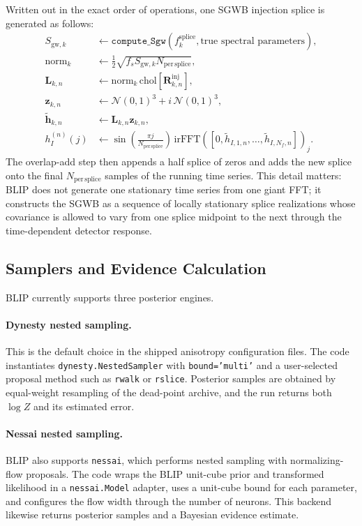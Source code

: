 \documentclass[11pt]{article}
\begin{document}
Written out in the exact order of operations, one SGWB injection splice is generated as follows:
\begin{align}
S_{\mathrm{gw},k} &\leftarrow \texttt{compute\_Sgw}(f_k^{\mathrm{splice}},\text{true spectral parameters}), \\
\mathrm{norm}_k &\leftarrow \frac{1}{2}\sqrt{f_s S_{\mathrm{gw},k} N_{\mathrm{per\,splice}}}, \\
\mathbf{L}_{k,n} &\leftarrow \mathrm{norm}_k\,\mathrm{chol}\!\left[\mathbf{R}_{k,n}^{\mathrm{inj}}\right], \\
\mathbf{z}_{k,n} &\leftarrow \mathcal{N}(0,1)^3+i\,\mathcal{N}(0,1)^3, \\
\tilde{\mathbf{h}}_{k,n} &\leftarrow \mathbf{L}_{k,n}\mathbf{z}_{k,n}, \\
h_I^{(n)}(j) &\leftarrow \sin\!\left(\frac{\pi j}{N_{\mathrm{per\,splice}}}\right)\,
\mathrm{irFFT}\!\left([0,\tilde{h}_{I,1,n},\dots,\tilde{h}_{I,N_f,n}]\right)_j .
\end{align}
The overlap-add step then appends a half splice of zeros and adds the new splice onto the final $N_{\mathrm{per\,splice}}$ samples of the running time series. This detail matters: BLIP does not generate one stationary time series from one giant FFT; it constructs the SGWB as a sequence of locally stationary splice realizations whose covariance is allowed to vary from one splice midpoint to the next through the time-dependent detector response.

\subsection{Samplers and Evidence Calculation}
BLIP currently supports three posterior engines.

\paragraph{Dynesty nested sampling.}
This is the default choice in the shipped anisotropy configuration files. The code instantiates \texttt{dynesty.NestedSampler} with \texttt{bound='multi'} and a user-selected proposal method such as \texttt{rwalk} or \texttt{rslice}. Posterior samples are obtained by equal-weight resampling of the dead-point archive, and the run returns both $\log Z$ and its estimated error.

\paragraph{Nessai nested sampling.}
BLIP also supports \texttt{nessai}, which performs nested sampling with normalizing-flow proposals. The code wraps the BLIP unit-cube prior and transformed likelihood in a \texttt{nessai.Model} adapter, uses a unit-cube bound for each parameter, and configures the flow width through the number of neurons. This backend likewise returns posterior samples and a Bayesian evidence estimate.
\end{document}
